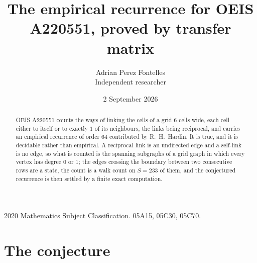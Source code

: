\documentclass[11pt,a4paper]{article}
\title{The empirical recurrence for OEIS A220551, proved by transfer matrix}
\author{Adrian Perez Fontelles\\ \small Independent researcher}
\date{2 September 2026}
\theoremstyle{plain}
\theoremstyle{definition}
\begin{document}
\maketitle

\begin{abstract}
OEIS A220551 counts the ways of linking the cells of a grid $6$ cells wide, each cell either to
itself or to exactly $1$ of its neighbours, the links being reciprocal, and carries an
empirical recurrence of order $64$ contributed by R.~H.~Hardin. It is true, and it is
decidable rather than empirical. A reciprocal link is an undirected edge and a self-link is
no edge, so what is counted is the spanning subgraphs of a grid graph in which every vertex
has degree $0$ or $1$; the edges crossing the boundary between two consecutive rows are a
state, the count is a walk count on $S=233$ of them, and the conjectured recurrence is then
settled by a finite exact computation.
\end{abstract}

\noindent\small 2020 Mathematics Subject Classification. 05A15, 05C30, 05C70.\normalsize

\section{The conjecture}
\end{document}
